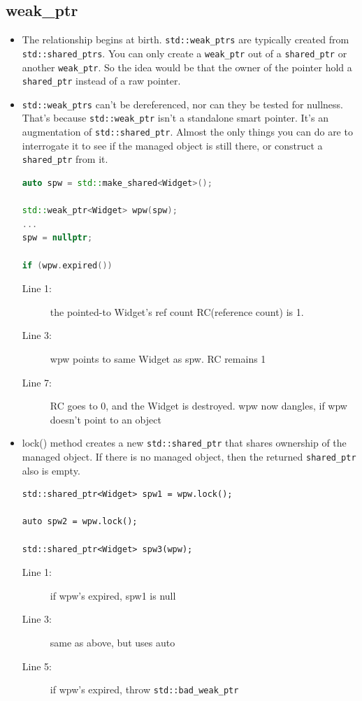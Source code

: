 \documentclass[a4paper,11pt,twoside]{book}
\begin{document}
\subsection{weak\_ptr}
\begin{itemize}

\item The relationship begins at birth. \texttt{std::weak\_ptrs} are typically created from \texttt{std::shared\_ptrs}. You can only create a \texttt{weak\_ptr} out of a \texttt{shared\_ptr} or another \texttt{weak\_ptr}. So the idea would be that the owner of the pointer hold a \texttt{shared\_ptr} instead of a raw pointer.


\item \texttt{std::weak\_ptrs} can't be dereferenced, nor can they be tested for nullness. That's because \texttt{std::weak\_ptr} isn't a standalone smart pointer. It's an augmentation of \texttt{std::shared\_ptr}. Almost the only things you can do are to interrogate it to see if the managed object is still there, or construct a \texttt{shared\_ptr} from it.

\begin{lstlisting}[frame=single, language=c++,mathescape=true]
auto spw = std::make_shared<Widget>();

std::weak_ptr<Widget> wpw(spw);
...
spw = nullptr;

if (wpw.expired())
\end{lstlisting}
\begin{description}
	\item[Line 1:] the pointed-to Widget's ref count RC(reference count) is 1.
	\item[Line 3:] wpw points to same Widget as spw. RC remains 1
	\item[Line 7:] RC goes to 0, and the Widget is destroyed. wpw now dangles, if wpw doesn't point to an object
\end{description}

\item lock() method creates a new \texttt{std::shared\_ptr} that shares ownership of the managed object. If there is no managed object, then the returned \texttt{shared\_ptr} also is empty.

\begin{lstlisting}
std::shared_ptr<Widget> spw1 = wpw.lock();

auto spw2 = wpw.lock();

std::shared_ptr<Widget> spw3(wpw);
\end{lstlisting}
\begin{description}
	\item[Line 1:] if wpw's expired, spw1 is null
	\item[Line 3:] same as above, but uses auto
	\item[Line 5:] if wpw's expired, throw \texttt{std::bad\_weak\_ptr}
\end{description}



\end{itemize}
\end{document}
